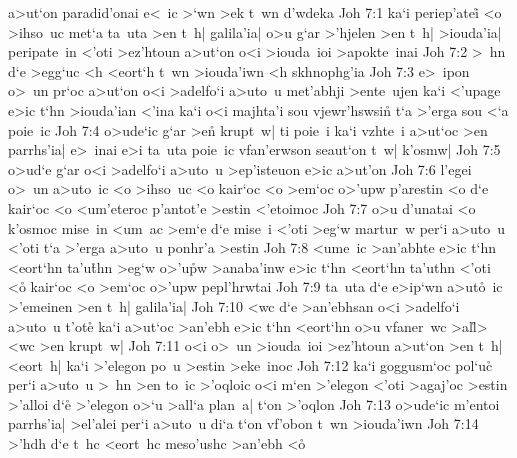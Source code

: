 a>ut`on
paradid'onai
e<~ic
>`wn
>ek
t~wn
d'wdeka\bibvsend
\vs Joh 7:1
ka`i
periep'atei\r{}
<o
>ihso~uc
met`a
ta~uta
>en
t~h|
galila'ia|
o>u
g`ar
>'hjelen
>en
t~h|
>iouda'ia|
peripate~in
<'oti
>ez'htoun
a>ut`on
o<i
>iouda~ioi
>apokte~inai\bibvsend
\vs Joh 7:2
>~hn
d`e
>egg`uc
<h
<eort`h
t~wn
>iouda'iwn
<h
skhnophg'ia\bibvsend
\vs Joh 7:3
e>~ipon
o>~un
pr`oc
a>ut`on
o<i
>adelfo`i
a>uto~u
met'abhji
>ente~ujen
ka`i
<'upage
e>ic
t`hn
>iouda'ian
<'ina
ka`i
o<i
majhta'i
sou
vjewr'hswsin\r{}
t`a
>'erga
sou
<`a
poie~ic\bibvsend
\vs Joh 7:4
o>ude`ic
g`ar
>en\r{}
krupt~w|
ti
poie~i
ka`i
vzhte~i
a>ut`oc
>en
parrhs'ia|
e>~inai
e>i
ta~uta
poie~ic
vfan'erwson
seaut`on
t~w|
k'osmw|\bibvsend
\vs Joh 7:5
o>ud`e
g`ar
o<i
>adelfo`i
a>uto~u
>ep'isteuon
e>ic
a>ut'on\bibvsend
\vs Joh 7:6
l'egei
o>~un
a>uto~ic
<o
>ihso~uc
<o
kair`oc
<o
>em`oc
o>'upw
p'arestin
<o
d`e
kair`oc
<o
<um'eteroc
p'antot'e
>estin
<'etoimoc\bibvsend
\vs Joh 7:7
o>u
d'unatai
<o
k'osmoc
mise~in
<um~ac
>em`e
d`e
mise~i
<'oti
>eg`w
martur~w
per`i
a>uto~u
<'oti
t`a
>'erga
a>uto~u
ponhr'a
>estin\bibvsend
\vs Joh 7:8
<ume~ic
>an'abhte
e>ic
t`hn
<eort`hn
ta'u\r{t}hn
>eg`w
o>'u\r{p}w
>anaba'inw
e>ic
t`hn
<eort`hn
ta'uthn
<'oti
<o\r{}
kair`oc
<o
>em`oc
o>'upw
pepl'hrwtai\bibvsend
\vs Joh 7:9
ta~uta
d`e
e>ip`wn
a>ut\r{o}~ic
>'emeinen
>en
t~h|
galila'ia|\bibvsend
\vs Joh 7:10
<wc
d`e
>an'ebhsan
o<i
>adelfo`i
a>uto~u
t'ote\r{}
ka`i
a>ut`oc
>an'ebh
e>ic
t`hn
<eort`hn
o>u
vfaner~wc
>al\r{l}>
<wc
>en
krupt~w|\bibvsend
\vs Joh 7:11
o<i
o>~un
>iouda~ioi
>ez'htoun
a>ut`on
>en
t~h|
<eort~h|
ka`i
>'elegon
po~u
>estin
>eke~inoc\bibvsend
\vs Joh 7:12
ka`i
goggusm`oc
pol`uc\r{}
per`i
a>uto~u
>~hn
>en
to~ic
>'oqloic
o<i
m`en
>'elegon
<'oti
>agaj'oc
>estin
>'alloi
d`e\r{}
>'elegon
o>`u
>all`a
plan~a|
t`on
>'oqlon\bibvsend
\vs Joh 7:13
o>ude`ic
m'entoi
parrhs'ia|
>el'alei
per`i
a>uto~u
di`a
t`on
vf'obon
t~wn
>iouda'iwn\bibvsend
\vs Joh 7:14
>'hdh
d`e
t~hc
<eort~hc
meso'ushc
>an'ebh
<o\r{}

